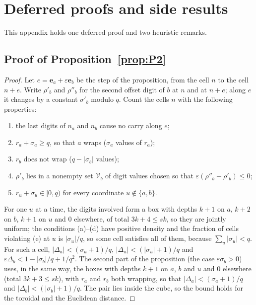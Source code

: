 \documentclass[11pt]{amsart}
\theoremstyle{definition}
\theoremstyle{plain}
\newcommand{\e}{\mathbf{e}}
\begin{document}
\section{Deferred proofs and side results}\label{app:proofs}
This appendix holds one deferred proof and two heuristic remarks.
\subsection{Proof of Proposition~\ref{prop:P2}}
\begin{proof}
Let $e=\e_a+\varepsilon\e_b$ be the step of the proposition, from the cell $n$ to the cell $n+e$. Write $\rho'_b$ and $\rho''_b$ for the second offset digit of $b$ at $n$ and at $n+e$; along $e$ it changes by a constant $\sigma'_b$ modulo $q$. Count the cells $n$ with the following properties:
\begin{enumerate}
\item[(a)] the last digits of $n_a$ and $n_b$ cause no carry along $e$;
\item[(b)] $r_a+\sigma_a\ge q$, so that $a$ wraps ($\sigma_a$ values of $r_a$);
\item[(c)] $r_b$ does not wrap ($q-|\sigma_b|$ values);
\item[(d)] $\rho'_b$ lies in a nonempty set $\mathcal V_b$ of digit values chosen so that $\varepsilon(\rho''_b-\rho'_b)\le0$;
\item[(e)] $r_u+\sigma_u\in[0,q)$ for every coordinate $u\notin\{a,b\}$.
\end{enumerate}
For one $u$ at a time, the digits involved form a box with depths $k+1$ on $a$, $k+2$ on $b$, $k+1$ on $u$ and $0$ elsewhere, of total $3k+4\le sk$, so they are jointly uniform; the conditions (a)--(d) have positive density and the fraction of cells violating (e) at $u$ is $|\sigma_u|/q$, so some cell satisfies all of them, because $\sum_u|\sigma_u|<q$. For such a cell, $|\Delta_a|<(\sigma_a+1)/q$, $|\Delta_u|<(|\sigma_u|+1)/q$ and $\varepsilon\Delta_b<1-|\sigma_b|/q+1/q^2$. The second part of the proposition (the case $\varepsilon\sigma_b>0$) uses, in the same way, the boxes with depths $k+1$ on $a$, $b$ and $u$ and $0$ elsewhere (total $3k+3\le sk$), with $r_a$ and $r_b$ both wrapping, so that $|\Delta_a|<(\sigma_a+1)/q$ and $|\Delta_b|<(|\sigma_b|+1)/q$. The pair lies inside the cube, so the bound holds for the toroidal and the Euclidean distance.
\end{proof}
\end{document}
